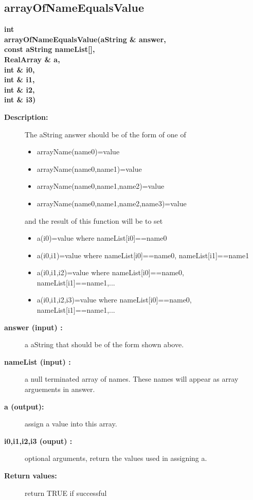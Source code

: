 \subsection{arrayOfNameEqualsValue}
 
\begin{flushleft} \textbf{%
int  \\ 
\settowidth{\NameListIncludeArgIndent}{arrayOfNameEqualsValue(}%
arrayOfNameEqualsValue(aString \& answer, \\ 
\hspace{\NameListIncludeArgIndent}const aString nameList[], \\ 
\hspace{\NameListIncludeArgIndent}RealArray \& a, \\ 
\hspace{\NameListIncludeArgIndent}int \& i0, \\ 
\hspace{\NameListIncludeArgIndent}int \& i1, \\ 
\hspace{\NameListIncludeArgIndent}int \& i2, \\ 
\hspace{\NameListIncludeArgIndent}int \& i3)
}\end{flushleft}
\begin{description}
\item[{\bf Description:}] 
    The aString answer should be of the form of one of
    \begin{itemize}
       \item arrayName(name0)=value
       \item arrayName(name0,name1)=value
       \item arrayName(name0,name1,name2)=value
       \item arrayName(name0,name1,name2,name3)=value
    \end{itemize}
   and the result of this function will be to set
    \begin{itemize}
       \item a(i0)=value where nameList[i0]==name0
       \item a(i0,i1)=value where nameList[i0]==name0, nameList[i1]==name1
       \item a(i0,i1,i2)=value where nameList[i0]==name0, nameList[i1]==name1,...
       \item a(i0,i1,i2,i3)=value where nameList[i0]==name0, nameList[i1]==name1,...
    \end{itemize}

    
\item[{\bf answer (input) :}]  a aString that should be of the form shown above.
\item[{\bf nameList (input) :}]  a null terminated array of names. These names will
    appear as array arguements in answer.
\item[{\bf a (output):}]  assign a value into this array.
\item[{\bf i0,i1,i2,i3 (ouput) :}]  optional arguments, return the values used in assigning a.
\item[{\bf Return values:}]  return TRUE if successful
\end{description}
